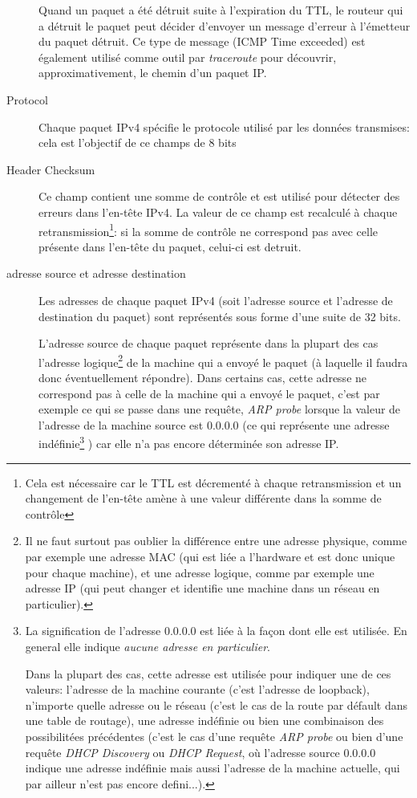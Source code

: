 \begin{description}
Quand un paquet a été détruit suite à l'expiration du TTL, le routeur qui a
détruit le paquet peut décider d'envoyer un message d'erreur à l'émetteur du
paquet détruit. Ce type de message (ICMP Time exceeded) est également utilisé comme
outil par {\it traceroute} pour découvrir, approximativement, le chemin 
d'un paquet IP.

\item [Protocol]
Chaque paquet IPv4 spécifie le protocole utilisé par les données transmises:
cela est l'objectif de ce champs de 8 bits 

\item [Header Checksum]
Ce champ contient une somme de contrôle et est utilisé pour détecter des 
erreurs dans l'en-tête IPv4. La valeur de ce champ est recalculé à
chaque retransmission\footnote {Cela est nécessaire car le TTL est décrementé
à chaque retransmission et un changement de l'en-tête amène à une valeur différente
dans la somme de contrôle}: si la somme de contrôle ne correspond pas avec celle 
présente dans l'en-tête du paquet, celui-ci est detruit.


\item [adresse source et adresse destination]
Les adresses de chaque paquet IPv4 (soit l'adresse source et l'adresse de
destination du paquet) sont représentés sous forme d'une suite de 32 bits.

L'adresse source de chaque paquet représente dans la plupart des cas
l'adresse logique\footnote {Il ne faut surtout pas oublier la différence entre
une adresse physique, comme par exemple une adresse MAC (qui est liée a
l'hardware et est donc unique pour chaque machine), et une adresse logique,
comme par exemple une adresse IP (qui peut changer et identifie une machine
dans un réseau en particulier).} de la machine qui a envoyé le paquet
(à laquelle il faudra donc éventuellement répondre).  Dans certains cas,
 cette adresse ne correspond pas à celle de la machine qui a envoyé
le paquet, c'est par exemple ce qui se passe dans une requête, {\it ARP probe}
lorsque la valeur de l'adresse de la machine source est 0.0.0.0 (ce qui représente
une adresse indéfinie\footnote {La signification de l'adresse 0.0.0.0
est liée à la façon dont elle est utilisée. En general elle indique {\it aucune
adresse en particulier}. 

Dans la plupart des cas, cette adresse est utilisée
pour indiquer une de ces valeurs: l'adresse de la machine courante (c'est
l'adresse de loopback), n'importe quelle adresse ou le réseau (c'est le cas de la
route par défault dans une table de routage), une adresse indéfinie ou bien une
combinaison des possibilitées précédentes (c'est le cas d'une requête {\it ARP
probe} ou bien d'une requête {\it DHCP Discovery} ou {\it DHCP Request}, où
 l'adresse source 0.0.0.0 indique une adresse indéfinie mais aussi l'adresse
de la machine actuelle, qui par ailleur n'est pas encore defini...).}
) car elle n'a pas encore déterminée son adresse IP. 


\end{description}

